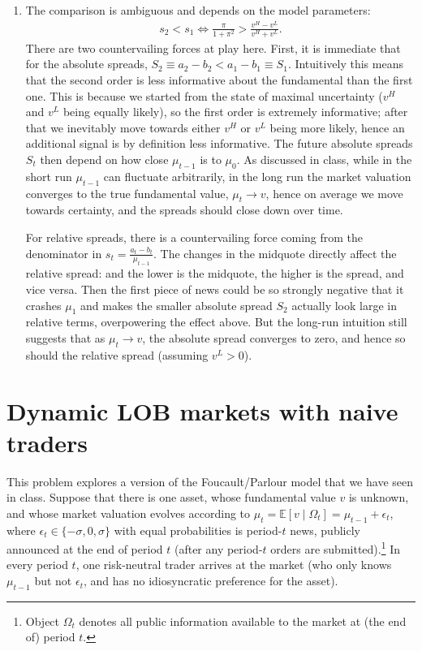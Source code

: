 \documentclass[a4paper]{article}
\begin{document}
\begin{enumerate}
	\item The comparison is ambiguous and depends on the model parameters:
	\begin{align*}
		s_2 < s_1 \iff \frac{\pi}{1+\pi^2} > \frac{v^H-v^L}{v^H+v^L}.
	\end{align*}
	There are two countervailing forces at play here. First, it is immediate that for the absolute spreads, $S_2 \equiv a_2-b_2 < a_1-b_1 \equiv S_1$. Intuitively this means that the second order is less informative about the fundamental than the first one. This is because we started from the state of maximal uncertainty ($v^H$ and $v^L$ being equally likely), so the first order is extremely informative; after that we inevitably move towards either $v^H$ or $v^L$ being more likely, hence an additional signal is by definition less informative. The future absolute spreads $S_t$ then depend on how close $\mu_{t-1}$ is to $\mu_0$. As discussed in class, while in the short run $\mu_{t-1}$ can fluctuate arbitrarily, in the long run the market valuation converges to the true fundamental value, $\mu_t \to v$, hence on average we move towards certainty, and the spreads should close down over time.
	
	For relative spreads, there is a countervailing force coming from the denominator in $s_t = \frac{a_t-b_t}{\mu_{t-1}}$. The changes in the midquote directly affect the relative spread: and the lower is the midquote, the higher is the spread, and vice versa. Then the first piece of news could be so strongly negative that it crashes $\mu_1$ and makes the smaller absolute spread $S_2$ actually look large in relative terms, overpowering the effect above. But the long-run intuition still suggests that as $\mu_t \to v$, the absolute spread converges to zero, and hence so should the relative spread (assuming $v^L>0$).
\end{enumerate}

\fi




\section{Dynamic LOB markets with naive traders}

This problem explores a version of the Foucault/Parlour model that we have seen in class.
Suppose that there is one asset, whose fundamental value $v$ is unknown, and whose market valuation evolves according to $\mu_t = \mathbb{E}[v \mid \Omega_t] = \mu_{t-1} + \epsilon_t$, where $\epsilon_t \in \{-\sigma, 0, \sigma\}$ with equal probabilities is period-$t$ news, publicly announced at the end of period $t$ (after any period-$t$ orders are submitted).\footnote{Object $\Omega_t$ denotes all public information available to the market at (the end of) period $t$.} 
In every period $t$, one risk-neutral trader arrives at the market (who only knows $\mu_{t-1}$ but not $\epsilon_{t}$, and has no idiosyncratic preference for the asset).
\end{document}
